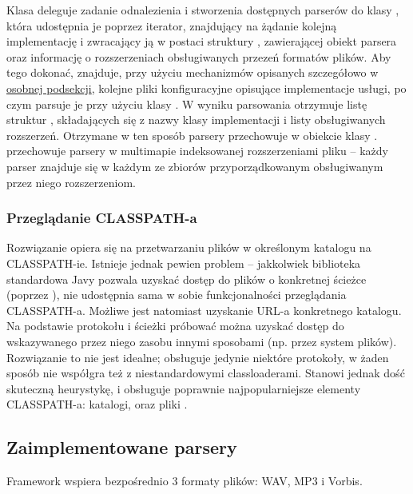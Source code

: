 Klasa  deleguje zadanie odnalezienia i stworzenia dostępnych parserów do klasy
, która udostępnia je poprzez iterator, znajdujący na żądanie kolejną
implementację i zwracający ją w postaci struktury , zawierającej obiekt parsera
oraz informację o rozszerzeniach obsługiwanych przezeń formatów plików. Aby tego dokonać,
 znajduje, przy użyciu mechanizmów opisanych szczegółowo w
\hyperref[sec:skaner_classpath]{osobnej podsekcji}, kolejne pliki konfiguracyjne opisujące
implementacje usługi, po czym parsuje je przy użyciu klasy . W wyniku
parsowania otrzymuje listę struktur , składających się z nazwy klasy
implementacji i listy obsługiwanych rozszerzeń. Otrzymane w ten sposób parsery 
przechowuje w obiekcie klasy .  przechowuje parsery w
multimapie indeksowanej rozszerzeniami pliku -- każdy parser znajduje się w każdym ze zbiorów
przyporządkowanym obsługiwanym przez niego rozszerzeniom.

\subsubsection{Przeglądanie CLASSPATH-a}
\label{sec:skaner_classpath}

Rozwiązanie opiera się na przetwarzaniu plików w określonym katalogu na CLASSPATH-ie. Istnieje
jednak pewien problem -- jakkolwiek biblioteka standardowa Javy pozwala uzyskać dostęp do plików o
konkretnej ścieżce (poprzez ), nie udostępnia sama w sobie
funkcjonalności przeglądania CLASSPATH-a. Możliwe jest natomiast uzyskanie URL-a konkretnego
katalogu. Na podstawie protokołu i ścieżki próbować można uzyskać dostęp do wskazywanego przez niego
zasobu innymi sposobami (np. przez system plików). Rozwiązanie to nie jest idealne; obsługuje
jedynie niektóre protokoły, w żaden sposób nie współgra też z niestandardowymi classloaderami.
Stanowi jednak dość skuteczną heurystykę, i obsługuje poprawnie najpopularniejsze elementy
CLASSPATH-a: katalogi, oraz pliki .



\subsection{Zaimplementowane parsery}

Framework wspiera bezpośrednio 3 formaty plików: WAV, MP3 i Vorbis.

